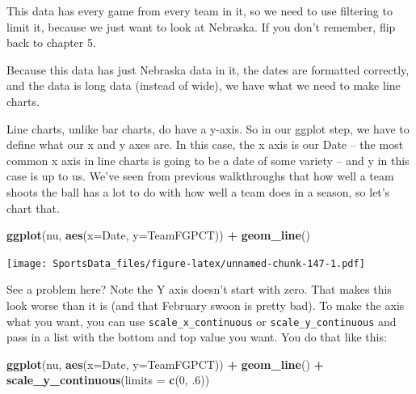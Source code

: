 \documentclass[
]{book}
\newenvironment{Shaded}{\begin{snugshade}}{\end{snugshade}}
\newcommand{\DataTypeTok}[1]{\textcolor[rgb]{0.13,0.29,0.53}{#1}}
\newcommand{\DecValTok}[1]{\textcolor[rgb]{0.00,0.00,0.81}{#1}}
\newcommand{\FloatTok}[1]{\textcolor[rgb]{0.00,0.00,0.81}{#1}}
\newcommand{\KeywordTok}[1]{\textcolor[rgb]{0.13,0.29,0.53}{\textbf{#1}}}
\newcommand{\NormalTok}[1]{#1}
\newcommand{\OperatorTok}[1]{\textcolor[rgb]{0.81,0.36,0.00}{\textbf{#1}}}
\newcommand{\StringTok}[1]{\textcolor[rgb]{0.31,0.60,0.02}{#1}}
\begin{document}
This data has every game from every team in it, so we need to use filtering to limit it, because we just want to look at Nebraska. If you don't remember, flip back to chapter 5.

\begin{Shaded}
\end{Shaded}

Because this data has just Nebraska data in it, the dates are formatted correctly, and the data is long data (instead of wide), we have what we need to make line charts.

Line charts, unlike bar charts, do have a y-axis. So in our ggplot step, we have to define what our x and y axes are. In this case, the x axis is our Date -- the most common x axis in line charts is going to be a date of some variety -- and y in this case is up to us. We've seen from previous walkthroughs that how well a team shoots the ball has a lot to do with how well a team does in a season, so let's chart that.

\begin{Shaded}
\begin{Highlighting}[]
\KeywordTok{ggplot}\NormalTok{(nu, }\KeywordTok{aes}\NormalTok{(}\DataTypeTok{x=}\NormalTok{Date, }\DataTypeTok{y=}\NormalTok{TeamFGPCT)) }\OperatorTok{+}\StringTok{ }\KeywordTok{geom_line}\NormalTok{()}
\end{Highlighting}
\end{Shaded}

\texttt{[image: SportsData\_files/figure-latex/unnamed-chunk-147-1.pdf]}

See a problem here? Note the Y axis doesn't start with zero. That makes this look worse than it is (and that February swoon is pretty bad). To make the axis what you want, you can use \texttt{scale\_x\_continuous} or \texttt{scale\_y\_continuous} and pass in a list with the bottom and top value you want. You do that like this:

\begin{Shaded}
\begin{Highlighting}[]
\KeywordTok{ggplot}\NormalTok{(nu, }\KeywordTok{aes}\NormalTok{(}\DataTypeTok{x=}\NormalTok{Date, }\DataTypeTok{y=}\NormalTok{TeamFGPCT)) }\OperatorTok{+}\StringTok{ }\KeywordTok{geom_line}\NormalTok{() }\OperatorTok{+}\StringTok{ }\KeywordTok{scale_y_continuous}\NormalTok{(}\DataTypeTok{limits =} \KeywordTok{c}\NormalTok{(}\DecValTok{0}\NormalTok{, }\FloatTok{.6}\NormalTok{))}
\end{Highlighting}
\end{Shaded}
\end{document}
